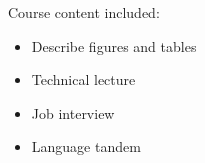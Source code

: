 Course content included:
\begin{itemize}
    \item Describe figures and tables
    \item Technical lecture
    \item Job interview
    \item Language tandem
\end{itemize}